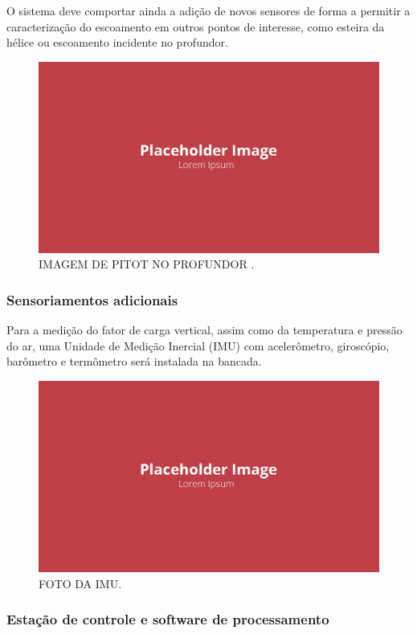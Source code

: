 O sistema deve comportar ainda a adição de novos sensores de forma a permitir a caracterização do escoamento em outros pontos de interesse, como esteira da hélice ou escoamento incidente no profundor.

\begin{figure}[!ht]
    \centering
    \includegraphics[width=.8\linewidth]{figuras/placeholder.png}
    \caption{IMAGEM DE PITOT NO PROFUNDOR \cite{autor}.}
    \label{fig:placeholder}
\end{figure}

\subsubsection{Sensoriamentos adicionais}

Para a medição do fator de carga vertical, assim como da temperatura e pressão do ar, uma Unidade de Medição Inercial (IMU) com acelerômetro, giroscópio, barômetro e termômetro será instalada na bancada.

\begin{figure}[!ht]
    \centering
    \includegraphics[width=.8\linewidth]{figuras/placeholder.png}
    \caption{FOTO DA IMU\cite{autor}.}
    \label{fig:placeholder}
\end{figure}

\subsubsection{Estação de controle e software de processamento}

